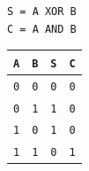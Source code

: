 \begin{verbatim}
S = A XOR B
C = A AND B
\end{verbatim}

\begin{tabular}{l l l l}
\toprule
\texttt{A} & \texttt{B} & \texttt{S} & \texttt{C} \\
\midrule
\texttt{0} & \texttt{0} & \texttt{0} & \texttt{0} \\
\texttt{0} & \texttt{1} & \texttt{1} & \texttt{0} \\
\texttt{1} & \texttt{0} & \texttt{1} & \texttt{0} \\
\texttt{1} & \texttt{1} & \texttt{0} & \texttt{1} \\
\bottomrule
\end{tabular}
